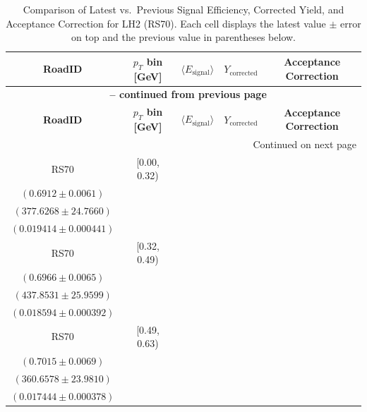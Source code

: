 {\footnotesize
\renewcommand{\arraystretch}{1.35}
\begin{longtable}{|c|c|c|c|c|}
\caption{Comparison of Latest vs.\ Previous Signal Efficiency, Corrected Yield, and Acceptance Correction for LH2 (RS70). Each cell displays the latest value $\pm$ error on top and the previous value in parentheses below.} \label{tab:eff_acc_comp_LH2_RS70} \\
\hline
\textbf{RoadID} & \textbf{$p_{T}$ bin [GeV]} & \textbf{$\langle E_{\mathrm{signal}} \rangle$} & \textbf{$Y_{\mathrm{corrected}}$} & \textbf{Acceptance Correction} \\
\hline
\endfirsthead
\multicolumn{5}{c}{{\bfseries \tablename\ \thetable{} -- continued from previous page}} \\
\hline
\textbf{RoadID} & \textbf{$p_{T}$ bin [GeV]} & \textbf{$\langle E_{\mathrm{signal}} \rangle$} & \textbf{$Y_{\mathrm{corrected}}$} & \textbf{Acceptance Correction} \\
\hline
\endhead
\hline \multicolumn{5}{|r|}{{Continued on next page}} \\ \hline
\endfoot
\hline
\endlastfoot
RS70 & [0.00, 0.32) & \begin{tabular}{@{}c@{}}$0.6946 \pm 0.0092$ \\ $(0.6912 \pm 0.0061)$\end{tabular} & \begin{tabular}{@{}c@{}}$375.7334 \pm 24.6418$ \\ $(377.6268 \pm 24.7660)$\end{tabular} & \begin{tabular}{@{}c@{}}$0.016654 \pm 0.000762$ \\ $(0.019414 \pm 0.000441)$\end{tabular} \\ \hline
RS70 & [0.32, 0.49) & \begin{tabular}{@{}c@{}}$0.7170 \pm 0.0089$ \\ $(0.6966 \pm 0.0065)$\end{tabular} & \begin{tabular}{@{}c@{}}$425.4087 \pm 25.2220$ \\ $(437.8531 \pm 25.9599)$\end{tabular} & \begin{tabular}{@{}c@{}}$0.017369 \pm 0.000710$ \\ $(0.018594 \pm 0.000392)$\end{tabular} \\ \hline
RS70 & [0.49, 0.63) & \begin{tabular}{@{}c@{}}$0.7045 \pm 0.0087$ \\ $(0.7015 \pm 0.0069)$\end{tabular} & \begin{tabular}{@{}c@{}}$359.1260 \pm 23.8792$ \\ $(360.6578 \pm 23.9810)$\end{tabular} & \begin{tabular}{@{}c@{}}$0.016235 \pm 0.000683$ \\ $(0.017444 \pm 0.000378)$\end{tabular} \\ \hline

\end{longtable}}
